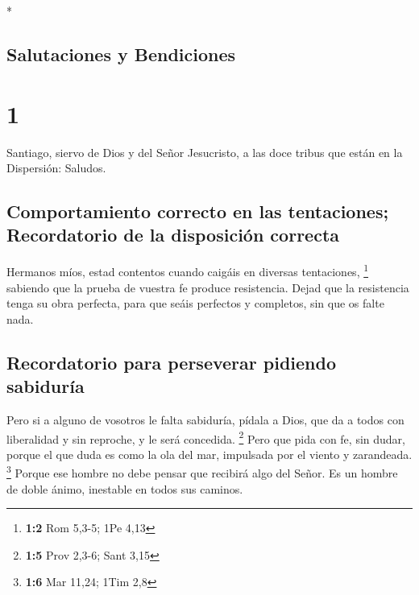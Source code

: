 \begin{paracol}{2} \switchcolumn[0]*

\hypertarget{salutaciones-y-bendiciones}{%
\subsection{Salutaciones y
Bendiciones}\label{salutaciones-y-bendiciones}}

\hypertarget{section}{%
\section{1}\label{section}}

 Santiago, siervo de Dios y del Señor Jesucristo, a las
doce tribus que están en la Dispersión: Saludos.

\hypertarget{comportamiento-correcto-en-las-tentaciones-recordatorio-de-la-disposiciuxf3n-correcta}{%
\subsection{Comportamiento correcto en las tentaciones; Recordatorio de
la disposición
correcta}\label{comportamiento-correcto-en-las-tentaciones-recordatorio-de-la-disposiciuxf3n-correcta}}

 Hermanos míos, estad contentos cuando caigáis en diversas
tentaciones, \footnote{\textbf{1:2} Rom 5,3-5; 1Pe 4,13} 
sabiendo que la prueba de vuestra fe produce resistencia. 
Dejad que la resistencia tenga su obra perfecta, para que seáis
perfectos y completos, sin que os falte nada.

\hypertarget{recordatorio-para-perseverar-pidiendo-sabiduruxeda}{%
\subsection{Recordatorio para perseverar pidiendo
sabiduría}\label{recordatorio-para-perseverar-pidiendo-sabiduruxeda}}

 Pero si a alguno de vosotros le falta sabiduría, pídala a
Dios, que da a todos con liberalidad y sin reproche, y le será
concedida. \footnote{\textbf{1:5} Prov 2,3-6; Sant 3,15} 
Pero que pida con fe, sin dudar, porque el que duda es como la ola del
mar, impulsada por el viento y zarandeada. \footnote{\textbf{1:6} Mar
  11,24; 1Tim 2,8}  Porque ese hombre no debe pensar que
recibirá algo del Señor.  Es un hombre de doble ánimo,
inestable en todos sus caminos.


\end{paracol}

